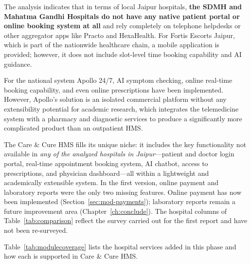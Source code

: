 The analysis indicates that in terms of local Jaipur hospitals, \textbf{the SDMH and Mahatma Gandhi Hospitals do not have any native patient portal or online booking system at all} and rely completely on telephone helpdesks or other aggregator apps like Practo and HexaHealth. For Fortis Escorts Jaipur, which is part of the nationwide healthcare chain, a mobile application is provided; however, it does not include slot-level time booking capability and AI guidance.

For the national system Apollo 24/7, AI symptom checking, online real-time booking capability, and even online prescriptions have been implemented. However, Apollo's solution is an isolated commercial platform without any extensibility potential for academic research, which integrates the telemedicine system with a pharmacy and diagnostic services to produce a significantly more complicated product than an outpatient HMS.

The Care \& Cure HMS fills its unique niche: it includes the key functionality not available in \textit{any of the analyzed hospitals in Jaipur}---patient and doctor login portal, real-time appointment booking system, AI chatbot, access to prescriptions, and physician dashboard---all within a lightweight and academically extensible system. In the first version, online payment and laboratory reports were the only two missing features. Online payment has now been implemented (Section~\ref{sec:mod-payments}); laboratory reports remain a future improvement area (Chapter~\ref{ch:conclude}). The hospital columns of Table~\ref{tab:comparison} reflect the survey carried out for the first report and have not been re-surveyed.

Table~\ref{tab:modulecoverage} lists the hospital services added in this phase and how each is supported in Care \& Cure HMS.

